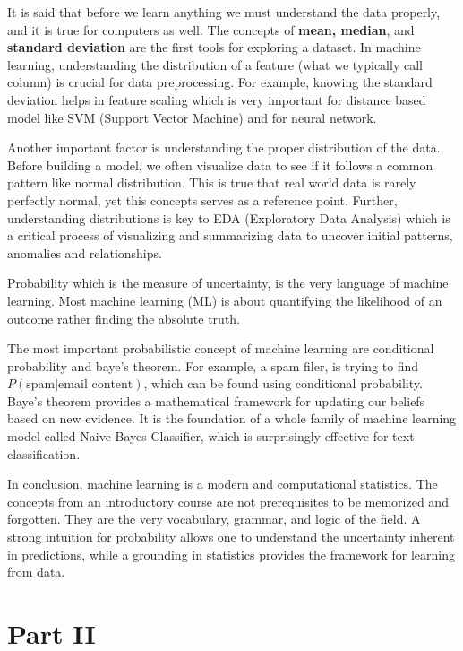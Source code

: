 \documentclass[12pt]{article}
\begin{document}
It is said that before we learn anything we must understand the data properly, and it is true for computers as well. The concepts of \textbf{mean, median}, and \textbf{standard deviation} are the first tools for exploring a dataset. In machine learning, understanding the distribution of a feature (what we typically call column) is crucial for data preprocessing. For example, knowing the standard deviation helps in feature scaling which is very important for distance based model like SVM (Support Vector Machine) and for neural network.

Another important factor is understanding the proper distribution of the data. Before building a model, we often visualize data to see if it follows a common pattern like normal distribution. This is true that real world data is rarely perfectly normal, yet this concepts serves as a reference point. Further, understanding distributions is key to EDA (Exploratory Data Analysis) which is a critical process of visualizing and summarizing data to uncover initial patterns, anomalies and relationships.

Probability which is the measure of uncertainty, is the very language of machine learning. Most machine learning (ML) is about quantifying the likelihood of an outcome rather finding the absolute truth.

The most important probabilistic concept of machine learning are conditional probability and baye's theorem. For example, a spam filer, is trying to find $P(\text{spam}|\text{email content})$, which can be found using conditional probability. Baye's theorem provides a mathematical framework for updating our beliefs based on new evidence. It is the foundation of a whole family of machine learning model called Naive Bayes Classifier, which is surprisingly effective for text classification.

In conclusion, machine learning is a modern and computational statistics. The concepts from an introductory course are not prerequisites to be memorized and forgotten. They are the very vocabulary, grammar, and logic of the field. A strong intuition for probability allows one to understand the uncertainty inherent in predictions, while a grounding in statistics provides the framework for learning from data.

\endgroup

\newpage

\section{Part II}
\end{document}
